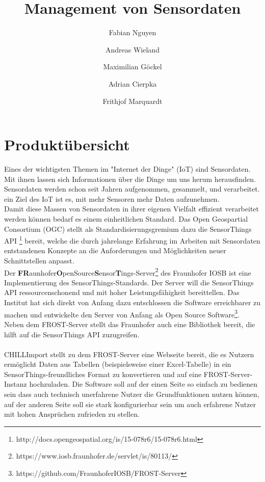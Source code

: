 \documentclass[a4paper, 12 pt]{article}
\author{Fabian Nguyen \and Andreas Wieland \and Maximilian Göckel \and Adrian Cierpka \and Frithjof Marquardt}
\title{Management von Sensordaten}
\begin{document}
\maketitle
\newpage
\tableofcontents
\newpage

	\section{Produktübersicht}

	Eines der wichtigsten Themen im "{Internet der Dinge}" (IoT) sind Sensordaten. Mit ihnen lassen sich Informationen über die Dinge um uns herum herausfinden. Sensordaten werden schon seit Jahren aufgenommen, gesammelt, und verarbeitet. ein Ziel des IoT ist es, mit mehr Sensoren mehr Daten aufzunehmen. \\

	Damit diese Massen von Sensordaten in ihrer eigenen Vielfalt effizient verarbeitet werden können bedarf es einem einheitlichen Standard. Das Open Geospartial Consortium (OGC) stellt als Standardisierungsgremium dazu die SensorThings API \footnote{http://docs.opengeospatial.org/is/15-078r6/15-078r6.html} bereit, welche die durch jahrelange Erfahrung im Arbeiten mit Sensordaten entstandenen Konzepte an die Anforderungen und Möglichkeiten neuer Schnittstellen anpasst. \\

	Der \textbf{FR}aunhofer\textbf{O}penSource\textbf{S}ensor\textbf{T}ings-Server\footnote{https://www.iosb.fraunhofer.de/servlet/is/80113/} des Fraunhofer IOSB ist eine Implementierung des SensorThings-Standards. Der Server will die SensorThings API ressourcenschonend und mit hoher Leistungsfähigkeit bereittellen. Das Institut hat sich direkt von Anfang dazu entschlossen die Software erreichbarer zu machen und entwickelte den Server von Anfang als Open Source Software\footnote{https://github.com/FraunhoferIOSB/FROST-Server}. \\

	Neben dem FROST-Server stellt das Fraunhofer auch eine Bibliothek bereit, die hilft auf die SensorThings API zuzugreifen. \\
	\ \\
	CHILLImport stellt zu dem FROST-Server eine Webseite bereit, die es Nutzern ermöglicht Daten aus Tabellen (beispielsweise einer Excel-Tabelle) in ein SensorThings-freundliches Format zu konvertieren und auf eine FROST-Server-Instanz hochzuladen. Die Software soll auf der einen Seite so einfach zu bedienen sein dass auch technisch unerfahrene Nutzer die Grundfunktionen nutzen können, auf der anderen Seite soll sie stark konfigurierbar sein um auch erfahrene Nutzer mit hohen Ansprüchen zufrieden zu stellen.\\
\end{document}
